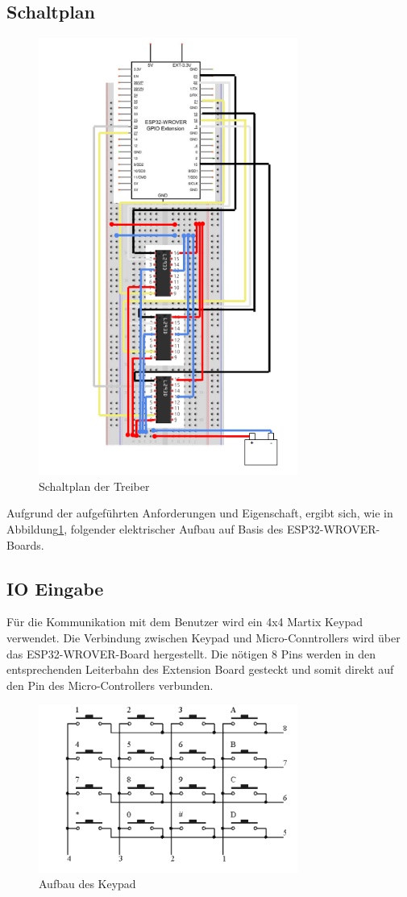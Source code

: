 \documentclass[conference,compsoc,final,a4paper]{IEEEtran}
\begin{document}
\subsection{Schaltplan}
\begin{figure}[h]
\includegraphics[width=8.5cm]{../images/schaltplan.png}
\caption{Schaltplan der Treiber}\label{Elektrik:Schaltplan}
\end{figure}

Aufgrund der aufgeführten Anforderungen und Eigenschaft, ergibt sich, wie in Abbildung\ref{Elektrik:Schaltplan}, folgender elektrischer Aufbau auf Basis des ESP32-WROVER-Boards.
\subsection{IO Eingabe}

Für die Kommunikation mit dem Benutzer wird ein 4x4 Martix Keypad verwendet. Die Verbindung zwischen Keypad und Micro-Conntrollers wird über das ESP32-WROVER-Board hergestellt. 
Die nötigen 8 Pins werden in den entsprechenden Leiterbahn des Extension Board gesteckt und somit direkt auf den Pin des Micro-Controllers verbunden.

\begin{figure}[h]
\includegraphics[width=8.5cm]{../images/keypad.png}
\caption{Aufbau des Keypad \autocite{freenoveTutorial}}\label{Elektrik:Keypad}
\end{figure}
\end{document}
